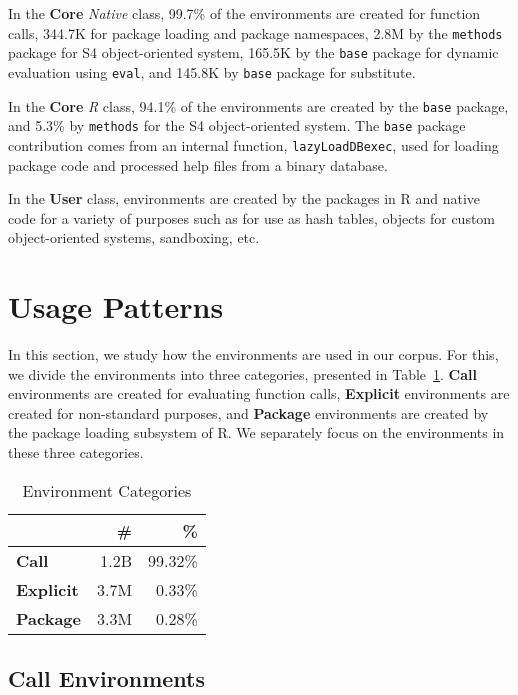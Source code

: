 \documentclass[10pt,review,sigplan,anonymous=true,authorversion=true,nonacm=true]{acmart}
\newcommand{\code}[1]{\lstinline |#1|\xspace}
\begin{document}
In the \textbf{Core} \emph{Native} class, 99.7\% of the environments are created
for function calls, 344.7K for package loading and package namespaces, 2.8M by
the \code{methods} package for S4 object-oriented system, 165.5K by the
\code{base} package for dynamic evaluation using \code{eval}, and 145.8K by
\code{base} package for substitute.

In the \textbf{Core} \emph{R} class, 94.1\% of the environments are created by
the \code{base} package, and 5.3\% by \code{methods} for the S4 object-oriented
system. The \code{base} package contribution comes from an internal function,
\code{lazyLoadDBexec}, used for loading package code and processed help files
from a binary database.

In the \textbf{User} class, environments are created by the packages in R and
native code for a variety of purposes such as for use as hash tables, objects
for custom object-oriented systems, sandboxing, etc.


\section{Usage Patterns}

In this section, we study how the environments are used in our corpus. For this,
we divide the environments into three categories, presented in
Table~\ref{table:env_category}. \textbf{Call} environments are created for
evaluating function calls, \textbf{Explicit} environments are created for
non-standard purposes, and \textbf{Package} environments are created by the
package loading subsystem of R. We separately focus on the environments in these
three categories.

\begin{table}[!h]
  \vspace{-3mm} \small
  \caption{Environment Categories} \label{table:env_category}
  \centering
  \begin{tabular}{lrr}
    \toprule
    &\textbf{\#}&\textbf{\%}\\
    \midrule
    \textbf{Call}&1.2B&99.32\%\\
    \textbf{Explicit}&3.7M&0.33\%\\
    \textbf{Package}&3.3M&0.28\%\\
    \bottomrule
  \end{tabular}
\end{table}


\subsection{Call Environments}
\end{document}

